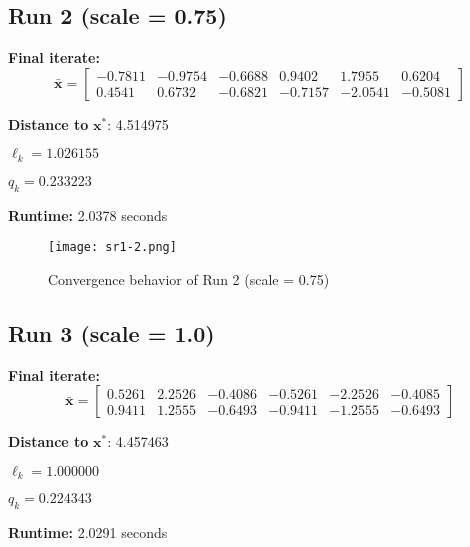 \documentclass{article}
\begin{document}

\subsection*{Run 2 (scale = 0.75)}
\vspace{1em}

\textbf{Final iterate:}
\[
\bar{\mathbf{x}} =
\begin{bmatrix}
-0.7811 & -0.9754 & -0.6688 & 0.9402 & 1.7955 & 0.6204 \\
0.4541 & 0.6732 & -0.6821 & -0.7157 & -2.0541 & -0.5081
\end{bmatrix}
\]

\vspace{0.5em}
\noindent
\textbf{Distance to } $\mathbf{x}^*$: 4.514975

\vspace{0.5em}
\noindent
$\ell_k = 1.026155$

\noindent
$q_k = 0.233223$

\vspace{0.5em}
\noindent
\textbf{Runtime:} 2.0378 seconds

\begin{figure}[H]
    \centering
    \texttt{[image: sr1-2.png]}
    \caption{Convergence behavior of Run 2 (scale = 0.75)}
\end{figure}


\subsection*{Run 3 (scale = 1.0)}
\vspace{1em}

\textbf{Final iterate:}
\[
\bar{\mathbf{x}} =
\begin{bmatrix}
0.5261 & 2.2526 & -0.4086 & -0.5261 & -2.2526 & -0.4085 \\
0.9411 & 1.2555 & -0.6493 & -0.9411 & -1.2555 & -0.6493
\end{bmatrix}
\]

\vspace{0.5em}
\noindent
\textbf{Distance to } $\mathbf{x}^*$: 4.457463

\vspace{0.5em}
\noindent
$\ell_k = 1.000000$

\noindent
$q_k = 0.224343$

\vspace{0.5em}
\noindent
\textbf{Runtime:} 2.0291 seconds
\end{document}
